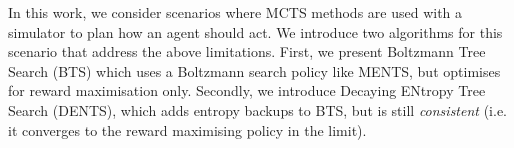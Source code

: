 \documentclass{article}
\theoremstyle{plain}
\begin{document}
    
    
    In this work, we consider scenarios where MCTS methods are used with a simulator to plan how an agent should act. We introduce two algorithms for this scenario that address the above limitations. First, we present Boltzmann Tree Search (BTS) which uses a Boltzmann search policy like MENTS, but optimises for reward maximisation only. Secondly, we introduce Decaying ENtropy Tree Search (DENTS), which adds entropy backups to BTS, but is still \textit{consistent} (i.e. it converges to the reward maximising policy in the limit). 
    
\end{document}
